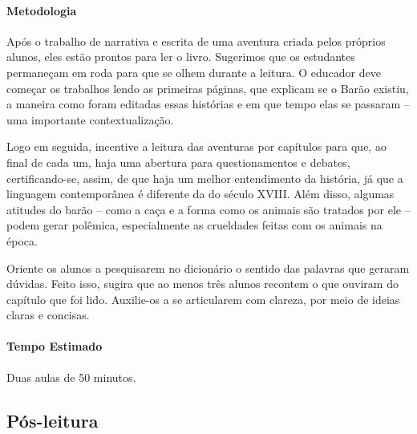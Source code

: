 \documentclass[11pt]{extarticle}
\begin{document}
\paragraph{Metodologia} Após o trabalho de narrativa e escrita de uma aventura criada pelos próprios alunos, eles estão prontos para ler o livro. Sugerimos que os estudantes permaneçam em roda para que se olhem durante a leitura. O educador deve começar os trabalhos lendo as primeiras páginas, que explicam se o Barão existiu, a maneira como foram editadas essas histórias e em que tempo elas se passaram -- uma importante contextualização. 

Logo em seguida, incentive a leitura das aventuras por capítulos para que, ao final de cada um, haja uma abertura para questionamentos e debates, certificando-se, assim, de que haja um melhor entendimento da história, já que a linguagem contemporânea é diferente da do século XVIII. Além disso, algumas atitudes do barão -- como a caça e a forma como os animais são tratados por ele -- podem gerar polêmica, especialmente as crueldades feitas com os animais na época. 

Oriente os alunos a pesquisarem no dicionário o sentido das palavras que geraram dúvidas. Feito isso, sugira que ao menos três alunos recontem o que ouviram do capítulo que foi lido. Auxilie-os a se articularem com clareza, por meio de ideias claras e concisas.

\paragraph{Tempo Estimado} Duas aulas de 50 minutos.  

\subsection{Pós-leitura}

\end{document}

